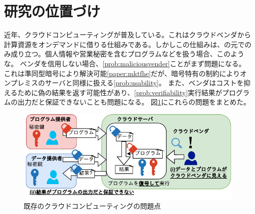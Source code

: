 
\section{研究の位置づけ}


近年、クラウドコンピューティングが普及している。これはクラウドベンダから計算資源をオンデマンドに借りる仕組みである。しかしこの仕組みは、の元でのみ成り立つ。個人情報や営業秘密を含むプログラムなどを扱う場合、このような。
ベンダを信用しない場合、\ref{prob:maliciousvender}ことがまず問題になる。
これは準同型暗号により解決可能\ref{paper:mktfhe}だが、暗号特有の制約によりオンプレミスのサーバと同様に扱える\ref{prob:usability}。
また、ベンダはコストを抑えるために偽の結果を返す可能性があり、\ref{prob:verifiability}実行結果がプログラムの出力だと保証できないことも問題になる。
図\ref{fig:problem}にこれらの問題をまとめた。
\begin{figure}[h]
    \centering
    \includegraphics[width=0.8\linewidth]{figures/problem.drawio.pdf}
    \vspace*{-0.5cm}
    \caption{既存のクラウドコンピューティングの問題点}
    \label{fig:problem}
\end{figure}

